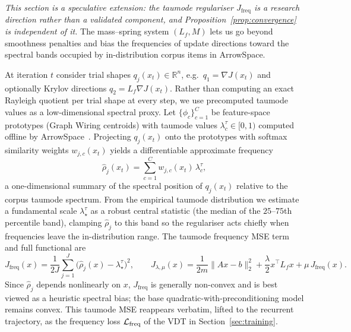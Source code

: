 \documentclass[12pt,a4paper]{article}
\theoremstyle{plain}
\theoremstyle{definition}
\theoremstyle{remark}
\newcommand{\R}{\mathbb{R}}
\newcommand{\1}{\mathbf{1}}
\newcommand{\VDT}{\textsc{VDT}}
\begin{document}
\emph{This section is a speculative extension: the taumode regulariser
$J_{\mathrm{freq}}$ is a research direction rather than a validated
component, and Proposition~\ref{prop:convergence} is independent of it.}
The mass--spring system $(L_f,M)$ lets us go beyond smoothness penalties
and bias the frequencies of update directions toward the spectral bands
occupied by in-distribution corpus items in ArrowSpace.

At iteration $t$ consider trial shapes $q_j(x_t) \in \R^n$, e.g.\
$q_1 = \nabla J(x_t)$ and optionally Krylov directions
$q_2 = L_f \nabla J(x_t)$. Rather than computing an exact Rayleigh
quotient per trial shape at every step, we use precomputed taumode
values as a low-dimensional spectral proxy. Let
$\{\phi_c\}_{c=1}^C$ be feature-space prototypes (Graph Wiring
centroids) with taumode values $\lambda^\tau_c \in [0,1)$ computed
offline by ArrowSpace~\cite{moriondo_arrowspace_2025,moriondo_graphwiring_2026}.
Projecting $q_j(x_t)$ onto the prototypes with softmax similarity weights
$w_{j,c}(x_t)$ yields a differentiable approximate frequency
\begin{equation}
    \hat\rho_j(x_t) = \sum_{c=1}^C w_{j,c}(x_t)\,\lambda^\tau_c,
    \label{eq:approx_freq}
\end{equation}
a one-dimensional summary of the spectral position of $q_j(x_t)$
relative to the corpus taumode spectrum. From the empirical taumode
distribution we estimate a fundamental scale $\lambda_\star^\tau$ as a
robust central statistic (the median of the $25$--$75$th percentile
band), clamping $\hat\rho_j$ to this band so the regulariser acts chiefly
when frequencies leave the in-distribution range. The taumode frequency
MSE term and full functional are
\begin{equation}
    J_{\mathrm{freq}}(x)
    = \frac{1}{2J} \sum_{j=1}^J \bigl( \hat\rho_j(x) - \lambda_\star^\tau \bigr)^2,
    \qquad
    J_{\lambda,\mu}(x) = \frac{1}{2m}\|Ax-b\|_2^2
      + \frac{\lambda}{2} x^\top L_f x + \mu\, J_{\mathrm{freq}}(x).
    \label{eq:freq_cost}
\end{equation}
Since $\hat\rho_j$ depends nonlinearly on $x$, $J_{\mathrm{freq}}$ is
generally non-convex and is best viewed as a heuristic spectral bias;
the base quadratic-with-preconditioning model remains convex.
This taumode MSE reappears verbatim, lifted to the recurrent trajectory,
as the frequency loss $\mathcal{L}_{\rm freq}$ of the \VDT{} in
Section~\ref{sec:training}.

\end{document}

